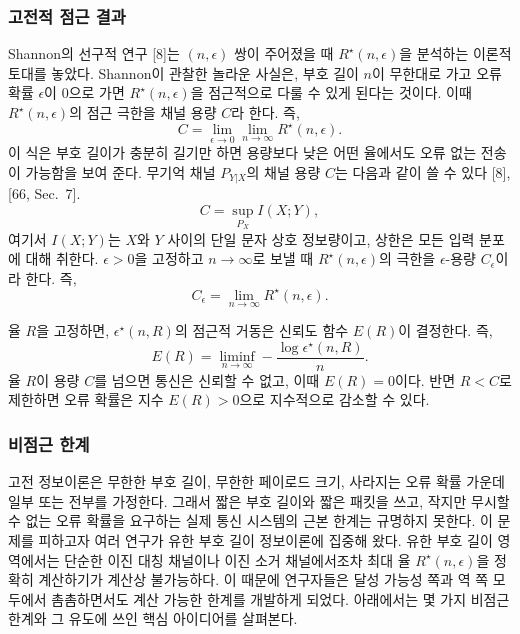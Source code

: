 \subsubsection{고전적 점근 결과}

Shannon의 선구적 연구 [8]는 $(n,\epsilon)$ 쌍이 주어졌을 때 $R^\star(n,\epsilon)$을 분석하는 이론적 토대를 놓았다. Shannon이 관찰한 놀라운 사실은, 부호 길이 $n$이 무한대로 가고 오류 확률 $\epsilon$이 0으로 가면 $R^\star(n,\epsilon)$을 점근적으로 다룰 수 있게 된다는 것이다. 이때 $R^\star(n,\epsilon)$의 점근 극한을 채널 용량 $C$라 한다. 즉,
\begin{equation}
C=\lim_{\epsilon\to0}\lim_{n\to\infty}R^\star(n,\epsilon). \tag{21}
\end{equation}
이 식은 부호 길이가 충분히 길기만 하면 용량보다 낮은 어떤 율에서도 오류 없는 전송이 가능함을 보여 준다. 무기억 채널 $P_{Y|X}$의 채널 용량 $C$는 다음과 같이 쓸 수 있다 [8], [66, Sec.~7].
\begin{equation}
C=\sup_{P_X}I(X;Y), \tag{22}
\end{equation}
여기서 $I(X;Y)$는 $X$와 $Y$ 사이의 단일 문자 상호 정보량이고, 상한은 모든 입력 분포에 대해 취한다. $\epsilon>0$을 고정하고 $n\to\infty$로 보낼 때 $R^\star(n,\epsilon)$의 극한을 $\epsilon$-용량 $C_\epsilon$이라 한다. 즉,
\begin{equation}
C_\epsilon=\lim_{n\to\infty}R^\star(n,\epsilon). \tag{23}
\end{equation}

율 $R$을 고정하면, $\epsilon^\star(n,R)$의 점근적 거동은 신뢰도 함수 $E(R)$이 결정한다. 즉,
\begin{equation}
E(R)=\liminf_{n\to\infty}-\frac{\log\epsilon^\star(n,R)}{n}. \tag{24}
\end{equation}
율 $R$이 용량 $C$를 넘으면 통신은 신뢰할 수 없고, 이때 $E(R)=0$이다. 반면 $R<C$로 제한하면 오류 확률은 지수 $E(R)>0$으로 지수적으로 감소할 수 있다.

\subsubsection{비점근 한계}

고전 정보이론은 무한한 부호 길이, 무한한 페이로드 크기, 사라지는 오류 확률 가운데 일부 또는 전부를 가정한다. 그래서 짧은 부호 길이와 짧은 패킷을 쓰고, 작지만 무시할 수 없는 오류 확률을 요구하는 실제 통신 시스템의 근본 한계는 규명하지 못한다. 이 문제를 피하고자 여러 연구가 유한 부호 길이 정보이론에 집중해 왔다. 유한 부호 길이 영역에서는 단순한 이진 대칭 채널이나 이진 소거 채널에서조차 최대 율 $R^\star(n,\epsilon)$을 정확히 계산하기가 계산상 불가능하다. 이 때문에 연구자들은 달성 가능성 쪽과 역 쪽 모두에서 촘촘하면서도 계산 가능한 한계를 개발하게 되었다. 아래에서는 몇 가지 비점근 한계와 그 유도에 쓰인 핵심 아이디어를 살펴본다.

